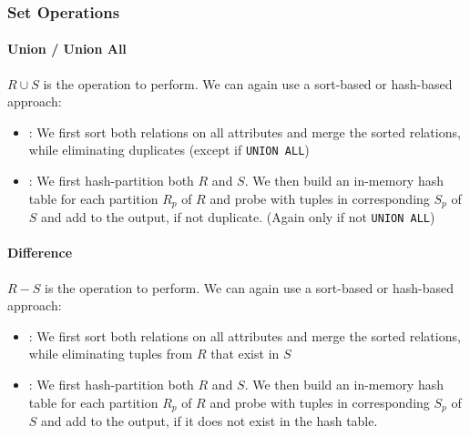 \subsubsection{Set Operations}
\paragraph{Union / Union All}
$R \cup S$ is the operation to perform.
We can again use a sort-based or hash-based approach:
\begin{itemize}
    \item {}: We first sort both relations on all attributes and merge the sorted relations, while eliminating duplicates (except if \texttt{UNION ALL})
    \item {}: We first hash-partition both $R$ and $S$.
          We then build an in-memory hash table for each partition $R_p$ of $R$ and probe with tuples in corresponding $S_p$ of $S$ and add to the output, if not duplicate.
          (Again only if not \texttt{UNION ALL})
\end{itemize}


\paragraph{Difference}
$R - S$ is the operation to perform.
We can again use a sort-based or hash-based approach:
\begin{itemize}
    \item {}: We first sort both relations on all attributes and merge the sorted relations, while eliminating tuples from $R$ that exist in $S$
    \item {}: We first hash-partition both $R$ and $S$.
          We then build an in-memory hash table for each partition $R_p$ of $R$ and probe with tuples in corresponding $S_p$ of $S$ and add to the output,
          if it does not exist in the hash table.
\end{itemize}
